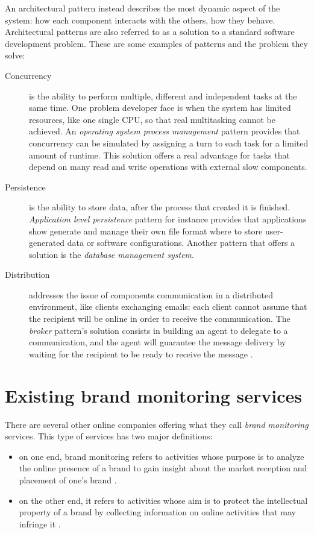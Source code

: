 An architectural pattern instead describes the most dynamic aspect of the
system: how each component interacts with the others, how they behave.
Architectural patterns are also referred to as a solution to a standard software
development problem. These are some examples of patterns and the problem they
solve:
\begin{description}
\item[Concurrency] is the ability to perform multiple, different and
independent tasks at the same time. One problem developer face is when the
system has limited resources, like one single CPU, so that real multitasking
cannot be achieved. An \emph{operating system process management} pattern
provides that concurrency can be simulated by assigning a turn to each task for
a limited amount of runtime. This solution offers a real advantage for tasks
that depend on many read and write operations with external slow components.
\item[Persistence] is the ability to store data, after the process that created
it is finished. \emph{Application level persistence} pattern for instance
provides that applications show generate and manage their own file format where
to store user-generated data or software configurations. Another pattern that
offers a solution is the \emph{database management system}.
\item[Distribution] addresses the issue of components communication in a
distributed environment, like clients exchanging emails: each client cannot
assume that the recipient will be online in order to receive the communication.
The \emph{broker} pattern's solution consists in building an agent to delegate
to a communication, and the agent will guarantee the message delivery by waiting
for the recipient to be ready to receive the message \cite{JB00}.
\end{description}

\section{Existing brand monitoring services}
There are several other online companies offering what they call \emph{brand
monitoring} services. This type of services has two major definitions:
\begin{itemize}
  \item on one end, brand monitoring refers to activities whose purpose is to
  analyze the online presence of a brand to gain insight about the market
  reception and placement of one's brand \cite{techpd}.
  \item on the other end, it refers to activities whose aim is to protect the
  intellectual property of a brand by collecting information on online
  activities that may infringe it \cite{cscbrand}.
\end{itemize}


